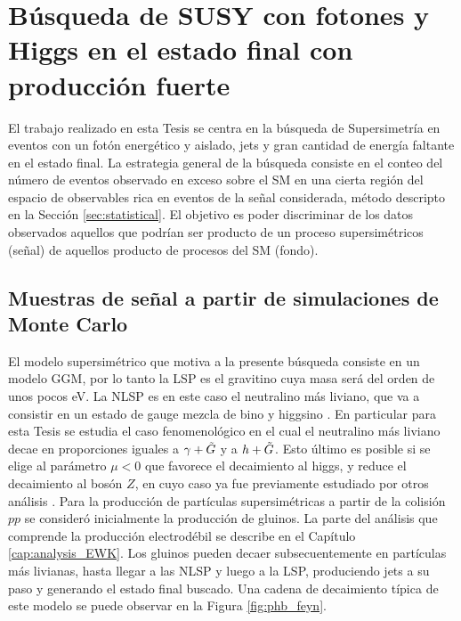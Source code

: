 \chapter{Búsqueda de SUSY con fotones y Higgs en el estado final con producción fuerte}




El trabajo realizado en esta Tesis se centra en la búsqueda de Supersimetría en eventos con un fotón energético y aislado, jets y gran cantidad de energía faltante en el estado final. La estrategia general de la búsqueda consiste en el conteo del número de eventos observado en exceso sobre el SM en una cierta región del espacio de observables rica en eventos de la señal considerada, método descripto en la Sección \ref{sec:statistical}. El objetivo es poder discriminar de los datos observados aquellos que podrían ser producto de un proceso supersimétricos (señal) de aquellos producto de procesos del SM (fondo).


\section{Muestras de señal a partir de simulaciones de Monte Carlo}

El modelo supersimétrico que motiva a la presente búsqueda consiste en un modelo GGM, por lo tanto la LSP es el gravitino cuya masa será del orden de unos pocos eV. La NLSP es en este caso el neutralino más liviano, que va a consistir en un estado de gauge mezcla de bino y higgsino
. En particular para esta Tesis se estudia el caso fenomenológico en el cual el neutralino más liviano decae en proporciones iguales a $\gamma+\tilde{G}$ y a $h+\tilde{G}$. Esto último es posible si se elige al parámetro $\mu<0$ que favorece el decaimiento al higgs, y reduce el decaimiento al bosón $Z$, en cuyo caso ya fue previamente estudiado por otros análisis \cite{tesis_fran, tesis_joaco}. Para la producción de partículas supersimétricas a partir de la colisión $pp$ se consideró inicialmente la producción de gluinos. La parte del análisis que comprende la producción electrodébil se describe en el Capítulo \ref{cap:analysis_EWK}. Los gluinos pueden decaer subsecuentemente en partículas más livianas, hasta llegar a las NLSP y luego a la LSP, produciendo jets a su paso y generando el estado final buscado. Una cadena de decaimiento típica de este modelo se puede observar en la Figura \ref{fig:phb_feyn}.

